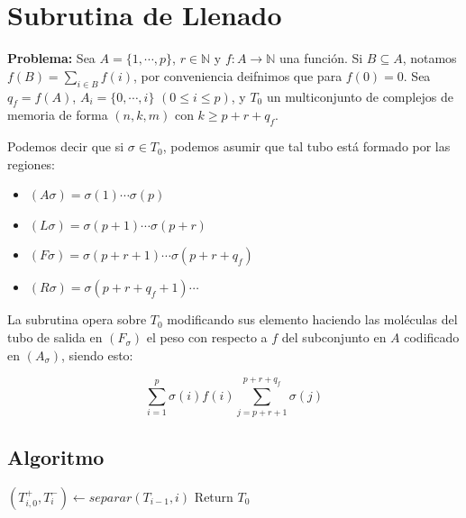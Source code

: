 \documentclass[12pt, letterpaper, twoside]{article}
\begin{document}
    \section{Subrutina de Llenado}
    \textbf{Problema:} Sea $A=\{1,\cdots,p\}$,  $r \in \mathbb{N}$ y $f:A\rightarrow\mathbb{N}$ una función. Si $B\subseteq A$, notamos $f(B)=\sum_{i\in B}f(i)$, por conveniencia deifnimos que para $f(0)=0$. Sea $q_f=f(A)$, $A_i=\{0,\cdots,i\}$ $(0\leq i\leq p)$, y $T_0$ un multiconjunto de complejos de memoria de forma $(n,k,m)$ con $k\geq p+r+q_f$.


    Podemos decir que si $\sigma\in T_0$, podemos asumir que tal tubo está formado por las regiones:
    \begin{multicols}{2}
        \begin{itemize}
            \item $(A\sigma )=\sigma (1)\cdots\sigma (p)$
            \item $(L\sigma )=\sigma (p+1)\cdots\sigma (p+r)$
            \item $(F\sigma)=\sigma(p+r+1)\cdots\sigma(p+r+q_f)$
            \item $(R\sigma)=\sigma(p+r+q_f+1)\cdots$
        \end{itemize} 
    \end{multicols}


    La subrutina opera sobre $T_0$ modificando sus elemento haciendo las moléculas del tubo de salida en $(F_\sigma)$ el peso con respecto a $f$ del subconjunto en $A$ codificado en $(A_\sigma)$, siendo esto:

    \begin{multicols}{2}
        \begin{equation*}
            \sum_{i=1}^{p}\sigma(i)f(i)
            \sum_{j=p+r+1}^{p+r+q_f}\sigma(j)
        \end{equation*}
    \end{multicols}

    \subsection{Algoritmo}
    \begin{algorithm}
        \begin{algorithmic}[1]
                \State $(T^+_{i,0}, T^-_i) \leftarrow separar(T_{i-1}, i)$
                \EndFor
            \EndFor
            \State Return $T_0$
            \EndProcedure
        \end{algorithmic}
    \end{algorithm}
\end{document}
